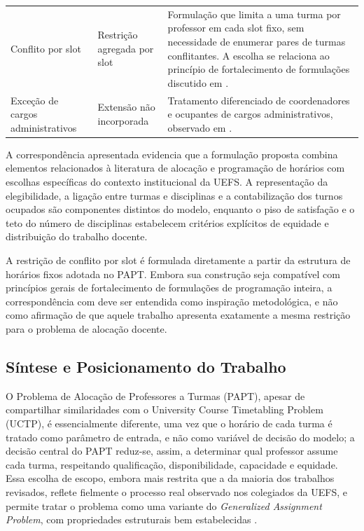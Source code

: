 \documentclass[11pt,a4paper]{article}
\begin{document}
\begin{table}[htbp]
\begin{tabular}{p{3.4cm}p{3.0cm}p{6.2cm}}
Conflito por slot
& Restrição agregada por slot
& Formulação que limita a uma turma por professor em cada slot
fixo, sem necessidade de enumerar pares de turmas conflitantes.
A escolha se relaciona ao princípio de fortalecimento de
formulações discutido em \cite{murthy2019}. \\

Exceção de cargos administrativos
& Extensão não incorporada
& Tratamento diferenciado de coordenadores e ocupantes de cargos
administrativos, observado em
\cite{souzafilho2009,permanhane2014}. \\

\bottomrule
\end{tabular}
\end{table}

A correspondência apresentada evidencia que a formulação proposta
combina elementos relacionados à literatura de alocação e
programação de horários com escolhas específicas do contexto
institucional da UEFS. A representação da elegibilidade, a ligação
entre turmas e disciplinas e a contabilização dos turnos ocupados
são componentes distintos do modelo, enquanto o piso de satisfação
e o teto do número de disciplinas estabelecem critérios explícitos
de equidade e distribuição do trabalho docente.

A restrição de conflito por slot é formulada diretamente a partir
da estrutura de horários fixos adotada no PAPT. Embora sua
construção seja compatível com princípios gerais de fortalecimento
de formulações de programação inteira, a correspondência com
\cite{murthy2019} deve ser entendida como inspiração metodológica,
e não como afirmação de que aquele trabalho apresenta exatamente
a mesma restrição para o problema de alocação docente.


\subsection{Síntese e Posicionamento do Trabalho}
 
O Problema de Alocação de Professores a Turmas (PAPT), apesar de compartilhar similaridades com o University Course Timetabling Problem (UCTP), é essencialmente diferente, uma vez que o horário de cada turma é tratado como parâmetro de entrada, e não como variável de decisão do modelo; a decisão central do PAPT reduz-se, assim, a determinar qual
professor assume cada turma, respeitando qualificação, disponibilidade, capacidade e equidade. Essa escolha de escopo, embora mais restrita que a da maioria dos trabalhos revisados, reflete fielmente o processo real observado nos colegiados da UEFS, e permite tratar o problema como uma variante do \textit{Generalized
Assignment Problem}, com propriedades estruturais bem estabelecidas
\cite{arenales2007pesquisa,martellototh1990}.
\end{document}

